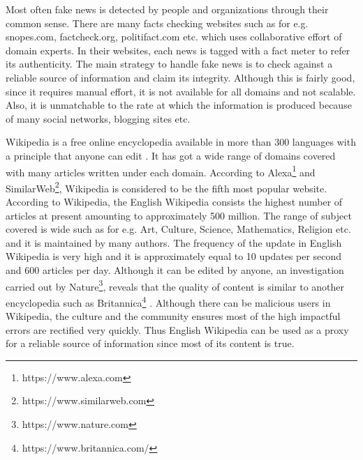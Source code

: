 \documentclass[a4paper, 11pt]{article}
\begin{document}
Most often fake news is detected by people and organizations through their common sense. There are many facts checking websites such as for e.g. snopes.com, factcheck.org, politifact.com etc. which uses collaborative effort of domain experts. In their websites, each news is tagged with a fact meter to refer its authenticity. The main strategy to handle fake news is to check against a reliable source of information and claim its integrity. Although this is fairly good, since it requires manual effort, it is not available for all domains and not scalable. Also, it is unmatchable to the rate at which the information is produced because of many social networks, blogging sites etc.

Wikipedia is a free online encyclopedia available in more than 300 languages with a principle that anyone can edit \cite{Wales2005}. It has got a wide range of domains covered with many articles written under each domain. According to Alexa\footnote{https://www.alexa.com} and SimilarWeb\footnote{https://www.similarweb.com}, Wikipedia is considered to be the fifth most popular website. According to Wikipedia, the English Wikipedia consists the highest number of articles at present amounting to approximately 500 million. The range of subject covered is wide such as for e.g. Art, Culture, Science, Mathematics, Religion etc. and it is maintained by many authors. The frequency of the update in English Wikipedia is very high and it is approximately equal to 10 updates per second and 600 articles per day. Although it can be edited by anyone, an investigation carried out by Nature\footnote{https://www.nature.com}, reveals that the quality of content is similar to another encyclopedia such as Britannica\footnote{https://www.britannica.com/} \cite{Wales2005}. Although there can be malicious users in Wikipedia, the culture and the community ensures most of the high impactful errors are rectified very quickly\cite{Priedhorsky2007}. Thus English Wikipedia can be used as a proxy for a reliable source of information since most of its content is true.
 
\end{document}
